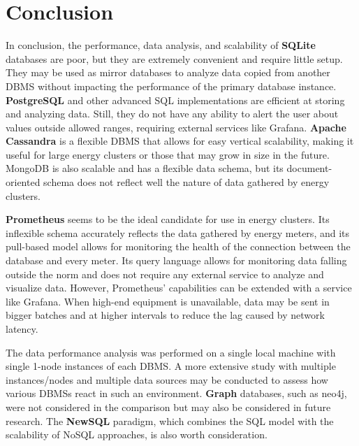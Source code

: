 \chapter{Conclusion}

\par In conclusion, the performance, data analysis, and scalability of \textbf{SQLite} databases are poor, but they are extremely convenient and require little setup. They may be used as mirror databases to analyze data copied from another DBMS without impacting the performance of the primary database instance. \textbf{PostgreSQL} and other advanced SQL implementations are efficient at storing and analyzing data. Still, they do not have any ability to alert the user about values outside allowed ranges, requiring external services like Grafana. \textbf{Apache Cassandra} is a flexible DBMS that allows for easy vertical scalability, making it useful for large energy clusters or those that may grow in size in the future. MongoDB is also scalable and has a flexible data schema, but its document-oriented schema does not reflect well the nature of data gathered by energy clusters.
\par \textbf{Prometheus} seems to be the ideal candidate for use in energy clusters. Its inflexible schema accurately reflects the data gathered by energy meters, and its pull-based model allows for monitoring the health of the connection between the database and every meter. Its query language allows for monitoring data falling outside the norm and does not require any external service to analyze and visualize data. However, Prometheus' capabilities can be extended with a service like Grafana. When high-end equipment is unavailable, data may be sent in bigger batches and at higher intervals to reduce the lag caused by network latency.
\par The data performance analysis was performed on a single local machine with single 1-node instances of each DBMS. A more extensive study with multiple instances/nodes and multiple data sources may be conducted to assess how various DBMSs react in such an environment. \textbf{Graph} databases, such as neo4j, were not considered in the comparison but may also be considered in future research. The \textbf{NewSQL} paradigm, which combines the SQL model with the scalability of NoSQL approaches, is also worth consideration.